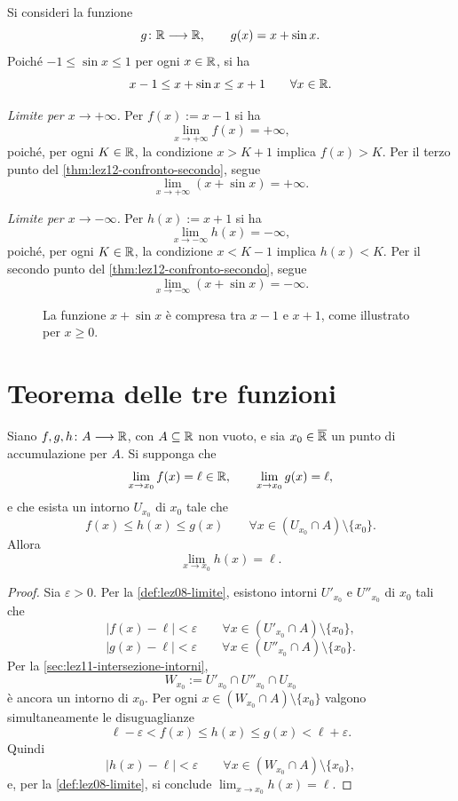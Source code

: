 \clearpage

\begin{example}
\label{ex:lez12-limite-x-seno}
Si consideri la funzione
\[
  g\colon\mathbb{R}\longrightarrow\mathbb{R},
  \qquad g(x)=x+\sin x.
\]
Poiché \(-1\le\sin x\le1\) per ogni \(x\in\mathbb{R}\), si ha
\[
  x-1\le x+\sin x\le x+1
  \qquad\forall x\in\mathbb{R}.
\]

\emph{Limite per \(x\to+\infty\).}
Per \(f(x):=x-1\) si ha
\[
  \lim_{x\to+\infty}f(x)=+\infty,
\]
poiché, per ogni \(K\in\mathbb{R}\), la condizione \(x>K+1\)
implica \(f(x)>K\). Per il terzo punto del
\cref{thm:lez12-confronto-secondo}, segue
\[
  \lim_{x\to+\infty}(x+\sin x)=+\infty.
\]

\emph{Limite per \(x\to-\infty\).}
Per \(h(x):=x+1\) si ha
\[
  \lim_{x\to-\infty}h(x)=-\infty,
\]
poiché, per ogni \(K\in\mathbb{R}\), la condizione \(x<K-1\)
implica \(h(x)<K\). Per il secondo punto del
\cref{thm:lez12-confronto-secondo}, segue
\[
  \lim_{x\to-\infty}(x+\sin x)=-\infty.
\]
\end{example}

\begin{figure}[htbp]
  \centering
  
  \caption{La funzione \(x+\sin x\) è compresa tra
  \(x-1\) e \(x+1\), come illustrato per \(x\ge0\).}
  \label{fig:lez12-confronto-seno}
\end{figure}

\clearpage

\section{Teorema delle tre funzioni}
\label{sec:lez12-tre-funzioni}

\begin{theorem}
\label{thm:lez12-tre-funzioni}
Siano \(f,g,h\colon A\longrightarrow\mathbb{R}\), con
\(A\subseteq\mathbb{R}\) non vuoto, e sia
\(x_0\in\overline{\mathbb{R}}\) un punto di accumulazione per \(A\).
Si supponga che
\[
  \lim_{x\to x_0}f(x)=\ell\in\mathbb{R},
  \qquad
  \lim_{x\to x_0}g(x)=\ell,
\]
e che esista un intorno \(U_{x_0}\) di \(x_0\) tale che
\[
  f(x)\le h(x)\le g(x)
  \qquad\forall x\in(U_{x_0}\cap A)\setminus\{x_0\}.
\]
Allora
\[
  \lim_{x\to x_0}h(x)=\ell.
\]
\end{theorem}

\begin{proof}
Sia \(\varepsilon>0\). Per la \cref{def:lez08-limite},
esistono intorni \(U'_{x_0}\) e \(U''_{x_0}\) di
\(x_0\) tali che
\[
  |f(x)-\ell|<\varepsilon
  \qquad\forall x\in(U'_{x_0}\cap A)\setminus\{x_0\},
\]
\[
  |g(x)-\ell|<\varepsilon
  \qquad\forall x\in(U''_{x_0}\cap A)\setminus\{x_0\}.
\]
Per la
\cref{sec:lez11-intersezione-intorni},
\[
  W_{x_0}:=U'_{x_0}\cap U''_{x_0}\cap U_{x_0}
\]
è ancora un intorno di \(x_0\). Per ogni
\(x\in(W_{x_0}\cap A)\setminus\{x_0\}\) valgono
simultaneamente le disuguaglianze
\[
  \ell-\varepsilon<f(x)\le h(x)
  \le g(x)<\ell+\varepsilon.
\]
Quindi
\[
  |h(x)-\ell|<\varepsilon
  \qquad\forall x\in(W_{x_0}\cap A)\setminus\{x_0\},
\]
e, per la \cref{def:lez08-limite}, si conclude
\(\lim_{x\to x_0}h(x)=\ell\).
\end{proof}

